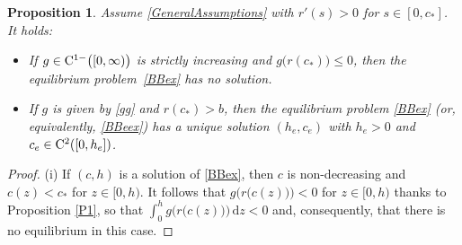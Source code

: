 \documentclass[reqno,11pt]{amsart}
\newtheorem{prop}[thm]{Proposition}
\numberwithin{equation}{section}
\newcommand{\rd}{\mathrm{d}}
\begin{document}
\begin{prop}\label{P2}
Assume \eqref{GeneralAssumptions} with $r'(s)>0$ for $s\in [0,c_*]$. It holds:
\begin{itemize}
\item[(i)] If $g\in {\rm C}^{1-}\bigl( [0,\infty)\bigr)$ is
  strictly increasing and $g \bigl( r(c_*)\bigr)\leq 0$, then the equilibrium
  problem~\eqref{BBex}  has no solution.
\item[(ii)] If $g$ is given by \eqref{gg} and $r(c_*)> b$, then the
  equilibrium problem \eqref{BBex} (or, equivalently, \eqref{BBeex}) has a unique solution $(h_e,c_e)$ 
  with $h_e>0$  and $c_e\in  {\rm C}^2([0,h_e])$.
\end{itemize}
\end{prop}
\begin{proof}
(i) If $(c,h)$ is a solution of \eqref{BBex}, then $c$ is
  non-decreasing and $c(z)< c_*$ for $z\in [0,h)$. It follows that
  $g\bigl( r\bigl(c(z)\bigr)\bigr)< 0$ for $z\in [0,h)$ thanks to
  Proposition \ref{P1}, so that
  $\int_0^h g\bigl( r\bigl(c(z)\bigr)\bigr)\,\rd z<0$ and,
  consequently, that there is no equilibrium in this case.


\end{proof}
\end{document}
